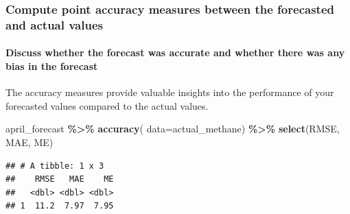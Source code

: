 \documentclass[
]{article}
\newenvironment{Shaded}{\begin{snugshade}}{\end{snugshade}}
\newcommand{\AttributeTok}[1]{\textcolor[rgb]{0.13,0.29,0.53}{#1}}
\newcommand{\FunctionTok}[1]{\textcolor[rgb]{0.13,0.29,0.53}{\textbf{#1}}}
\newcommand{\NormalTok}[1]{#1}
\newcommand{\SpecialCharTok}[1]{\textcolor[rgb]{0.81,0.36,0.00}{\textbf{#1}}}
\begin{document}
\hypertarget{compute-point-accuracy-measures-between-the-forecasted-and-actual-values}{%
\subsubsection{Compute point accuracy measures between the forecasted
and actual
values}\label{compute-point-accuracy-measures-between-the-forecasted-and-actual-values}}

\hypertarget{discuss-whether-the-forecast-was-accurate-and-whether-there-was-any-bias-in-the-forecast}{%
\paragraph{Discuss whether the forecast was accurate and whether there
was any bias in the
forecast}\label{discuss-whether-the-forecast-was-accurate-and-whether-there-was-any-bias-in-the-forecast}}

The accuracy measures provide valuable insights into the performance of
your forecasted values compared to the actual values.

\begin{Shaded}
\begin{Highlighting}[]
\NormalTok{april\_forecast }\SpecialCharTok{\%\textgreater{}\%}
  \FunctionTok{accuracy}\NormalTok{( }\AttributeTok{data=}\NormalTok{actual\_methane) }\SpecialCharTok{\%\textgreater{}\%}
  \FunctionTok{select}\NormalTok{(RMSE, MAE, ME)}
\end{Highlighting}
\end{Shaded}

\begin{verbatim}
## # A tibble: 1 x 3
##    RMSE   MAE    ME
##   <dbl> <dbl> <dbl>
## 1  11.2  7.97  7.95
\end{verbatim}
\end{document}
